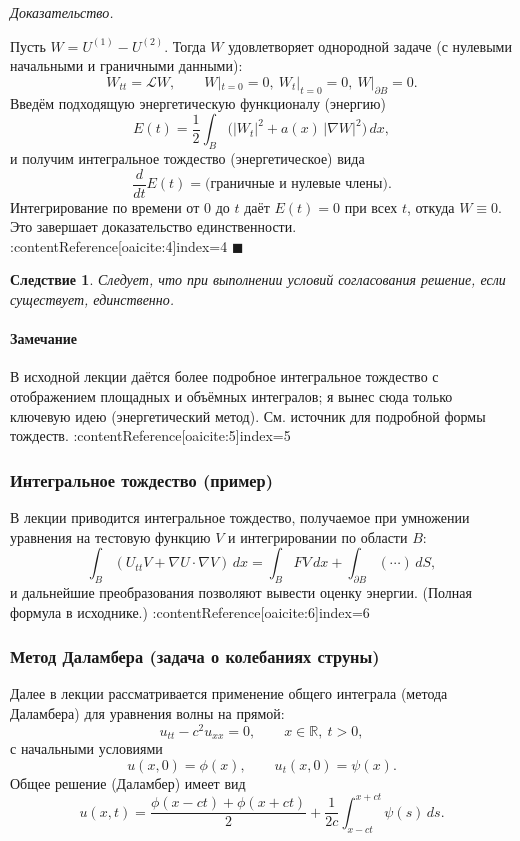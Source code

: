 \documentclass[12pt,a4paper]{article}
\newcommand{\qheading}[1]{\paragraph{#1}}
\theoremstyle{definition}
\theoremstyle{plain}
\newtheorem{corollary}[definition]{Следствие}
\theoremstyle{remark}
\renewenvironment{proof}[1][Доказательство]{%
	\par\noindent\textit{#1.}\quad
}{\hfill\(\blacksquare\)\par}
\numberwithin{equation}{subsubsection}
\begin{document}
	\begin{proof}
		Пусть \(W=U^{(1)}-U^{(2)}\). Тогда \(W\) удовлетворяет однородной задаче (с нулевыми начальными и граничными данными):
		\[
		W_{tt} = \mathcal{L} W,\qquad W|_{t=0}=0,\ W_t|_{t=0}=0,\ W|_{\partial B}=0.
		\]
		Введём подходящую энергетическую функционалу (энергию)
		\[
		E(t)=\frac12\int_B \big( |W_t|^2 + a(x)\,|\nabla W|^2 \big)\,dx,
		\]
		и получим интегральное тождество (энергетическое) вида
		\[
		\frac{d}{dt}E(t) = \text{(граничные и нулевые члены)}.
		\]
		Интегрирование по времени от \(0\) до \(t\) даёт \(E(t)=0\) при всех \(t\), откуда \(W\equiv 0\). Это завершает доказательство единственности. :contentReference[oaicite:4]{index=4}
	\end{proof}
	
	\begin{corollary}
		Следует, что при выполнении условий согласования решение, если существует, единственно.
	\end{corollary}
	
	\qheading{Замечание}
	В исходной лекции даётся более подробное интегральное тождество с отображением площадных и объёмных интегралов; я вынес сюда только ключевую идею (энергетический метод). См. источник для подробной формы тождеств. :contentReference[oaicite:5]{index=5}
	
	\subsubsection{Интегральное тождество (пример)}
	В лекции приводится интегральное тождество, получаемое при умножении уравнения на тестовую функцию \(V\) и интегрировании по области \(B\):
	\[
	\int_B (U_{tt}V + \nabla U\cdot\nabla V)\,dx = \int_B F V\,dx + \int_{\partial B}(\cdots)\,dS,
	\]
	и дальнейшие преобразования позволяют вывести оценку энергии. (Полная формула в исходнике.) :contentReference[oaicite:6]{index=6}
	
	\subsubsection{Метод Даламбера (задача о колебаниях струны)}
	Далее в лекции рассматривается применение общего интеграла (метода Даламбера) для уравнения волны на прямой:
	\[
	u_{tt}-c^2 u_{xx}=0,\qquad x\in\mathbb{R},\ t>0,
	\]
	с начальными условиями
	\[
	u(x,0)=\phi(x),\qquad u_t(x,0)=\psi(x).
	\]
	Общее решение (Даламбер) имеет вид
	\[
	u(x,t)=\frac{\phi(x-ct)+\phi(x+ct)}{2}+\frac{1}{2c}\int_{x-ct}^{x+ct}\psi(s)\,ds.
	\]
	
\end{document}

